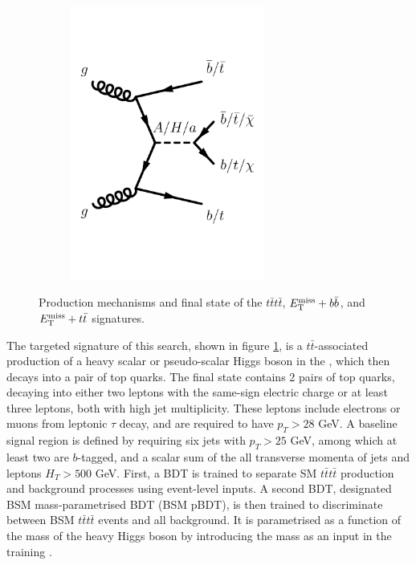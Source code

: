 \begin{figure}[h!]
    \centering
    \begin{subfigure}[3]{0.48\textwidth}
        \centering
        \includegraphics[width=0.7\textwidth]{figures/fig_01e.pdf}
    \end{subfigure}
    \caption{Production mechanisms and final state of the $t\bar{t}t\bar{t}$, $E_{\mathrm{T}}^{\mathrm{miss}}+b\bar{b}$, and $E_{\mathrm{T}}^{\mathrm{miss}}+t\bar{t}$ signatures.}
    \label{fig:tttt-signature}
\end{figure} 

The targeted signature of this search, shown in figure \ref{fig:tttt-signature}, is a $t\bar{t}$-associated production of a heavy scalar or pseudo-scalar Higgs boson in the \hdma, which then decays into a pair of top quarks\cite{EXOT-2019-26}. The final state contains 2 pairs of top quarks, decaying into either two leptons with the same-sign electric charge or at least three leptons, both with high jet multiplicity. These leptons include electrons or muons from leptonic $\tau$ decay, and are required to have $p_T>28$ GeV. A baseline signal region is defined by requiring six jets with $p_T>25$ GeV, among which at least two are $b$-tagged, and a scalar sum of the all transverse momenta of jets and leptons $H_T>500$ GeV. First, a BDT is trained to separate SM $t\bar{t}t\bar{t}$ production and background processes using event-level inputs. A second BDT, designated BSM mass-parametrised BDT (BSM pBDT), is then trained to discriminate between BSM $t\bar{t}t\bar{t}$ events and all background. It is parametrised as a function of the mass of the heavy Higgs boson by introducing the mass as an input in the training \cite{Baldi:2016fzo}.

